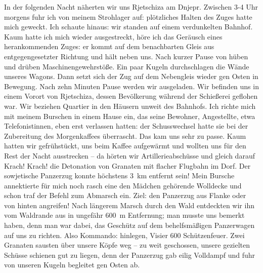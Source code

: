 In der folgenden Nacht näherten wir uns Rjetschiza am Dnjepr. Zwischen 3-4 Uhr morgens fuhr ich von meinem Strohlager auf: plötzliches Halten des Zuges hatte mich geweckt. Ich schaute hinaus: wir standen auf einem verdunkelten Bahnhof. Kaum hatte ich mich wieder ausgestreckt, höre ich das Geräusch eines herankommenden Zuges: er kommt auf dem benachbarten Gleis aus entgegengesetzter Richtung und hält neben uns. Nach kurzer Pause von hüben und drüben Maschinengewehrstöße. Ein paar Kugeln durchschlagen die Wände unseres Wagons. Dann setzt sich der Zug auf dem Nebengleis wieder gen Osten in Bewegung. Nach zehn Minuten Pause werden wir ausgeladen. Wir befinden uns in einem Vorort von Rjetschiza, dessen Bevölkerung während der Schießerei geflohen war. Wir beziehen Quartier in den Häusern unweit des Bahnhofs. Ich richte mich mit meinem Burschen in einem Hause ein, das seine Bewohner, Angestellte, etwa Telefonistinnen, eben erst verlassen hatten: der Schusswechsel hatte sie bei der Zubereitung des Morgenkaffees überrascht. Das kam uns sehr zu passe. Kaum hatten wir gefrühstückt, uns beim Kaffee aufgewärmt und wollten uns für den Rest der Nacht ausstrecken -- da hörten wir Artillerieabschüsse und gleich darauf Krach! Krach! die Detonation von Granaten mit flacher Flugbahn im Dorf. Der sowjetische Panzerzug konnte höchstens 3~km entfernt sein! Mein Bursche annektierte für mich noch rasch eine den Mädchen gehörende Wolldecke und schon traf der Befehl zum Abmarsch ein. Ziel: den Panzerzug aus Flanke oder von hinten angreifen! Nach längerem Marsch durch den Wald entdeckten wir ihn vom Waldrande aus in ungefähr 600~m Entfernung; man musste uns bemerkt haben, denn man war dabei, das Geschütz auf dem behelfsmäßigen Panzerwagen auf uns zu richten. Also Kommando: hinlegen, Visier 600 Schützenfeuer. Zwei Granaten sausten über unsere Köpfe weg -- zu weit geschossen, unsere gezielten Schüsse schienen gut zu liegen, denn der Panzerzug gab eilig Volldampf und fuhr von unseren Kugeln begleitet gen Osten ab.

